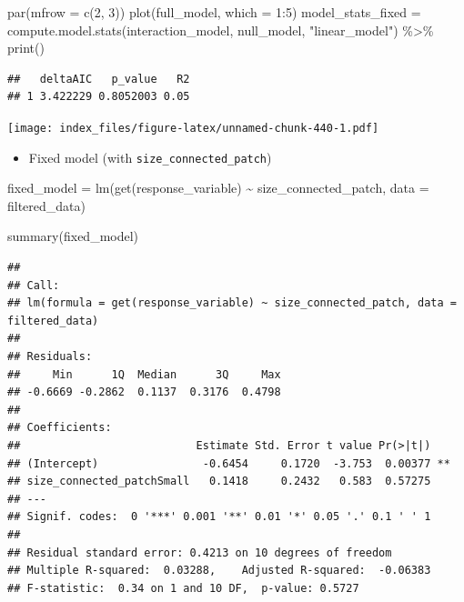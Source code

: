 \documentclass[
]{article}
\newenvironment{Shaded}{\begin{snugshade}}{\end{snugshade}}
\newcommand{\AttributeTok}[1]{\textcolor[rgb]{0.77,0.63,0.00}{#1}}
\newcommand{\DecValTok}[1]{\textcolor[rgb]{0.00,0.00,0.81}{#1}}
\newcommand{\FunctionTok}[1]{\textcolor[rgb]{0.00,0.00,0.00}{#1}}
\newcommand{\NormalTok}[1]{#1}
\newcommand{\OtherTok}[1]{\textcolor[rgb]{0.56,0.35,0.01}{#1}}
\newcommand{\SpecialCharTok}[1]{\textcolor[rgb]{0.00,0.00,0.00}{#1}}
\newcommand{\StringTok}[1]{\textcolor[rgb]{0.31,0.60,0.02}{#1}}
\providecommand{\tightlist}{%
  \setlength{\itemsep}{0pt}\setlength{\parskip}{0pt}}
\begin{document}
\begin{Shaded}
\begin{Highlighting}[]
\FunctionTok{par}\NormalTok{(}\AttributeTok{mfrow =} \FunctionTok{c}\NormalTok{(}\DecValTok{2}\NormalTok{, }\DecValTok{3}\NormalTok{))}
\FunctionTok{plot}\NormalTok{(full\_model, }\AttributeTok{which =} \DecValTok{1}\SpecialCharTok{:}\DecValTok{5}\NormalTok{)}
\NormalTok{model\_stats\_fixed }\OtherTok{=} \FunctionTok{compute.model.stats}\NormalTok{(interaction\_model,}
\NormalTok{                                        null\_model,}
                                        \StringTok{"linear\_model"}\NormalTok{) }\SpecialCharTok{\%\textgreater{}\%}
  \FunctionTok{print}\NormalTok{()}
\end{Highlighting}
\end{Shaded}

\begin{verbatim}
##   deltaAIC   p_value   R2
## 1 3.422229 0.8052003 0.05
\end{verbatim}

\texttt{[image: index\_files/figure-latex/unnamed-chunk-440-1.pdf]}

\begin{itemize}
\tightlist
\item
  Fixed model (with \texttt{size\_connected\_patch})
\end{itemize}

\begin{Shaded}
\begin{Highlighting}[]
\NormalTok{fixed\_model }\OtherTok{=} \FunctionTok{lm}\NormalTok{(}\FunctionTok{get}\NormalTok{(response\_variable) }\SpecialCharTok{\textasciitilde{}}
\NormalTok{                   size\_connected\_patch,}
                 \AttributeTok{data =}\NormalTok{ filtered\_data)}

\FunctionTok{summary}\NormalTok{(fixed\_model)}
\end{Highlighting}
\end{Shaded}

\begin{verbatim}
## 
## Call:
## lm(formula = get(response_variable) ~ size_connected_patch, data = filtered_data)
## 
## Residuals:
##     Min      1Q  Median      3Q     Max 
## -0.6669 -0.2862  0.1137  0.3176  0.4798 
## 
## Coefficients:
##                           Estimate Std. Error t value Pr(>|t|)   
## (Intercept)                -0.6454     0.1720  -3.753  0.00377 **
## size_connected_patchSmall   0.1418     0.2432   0.583  0.57275   
## ---
## Signif. codes:  0 '***' 0.001 '**' 0.01 '*' 0.05 '.' 0.1 ' ' 1
## 
## Residual standard error: 0.4213 on 10 degrees of freedom
## Multiple R-squared:  0.03288,    Adjusted R-squared:  -0.06383 
## F-statistic:  0.34 on 1 and 10 DF,  p-value: 0.5727
\end{verbatim}
\end{document}
